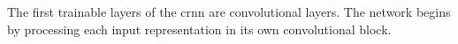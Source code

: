 
The first trainable layers of the \gls{crnn} are
convolutional layers. The network begins by processing each
input representation in its own convolutional block.
